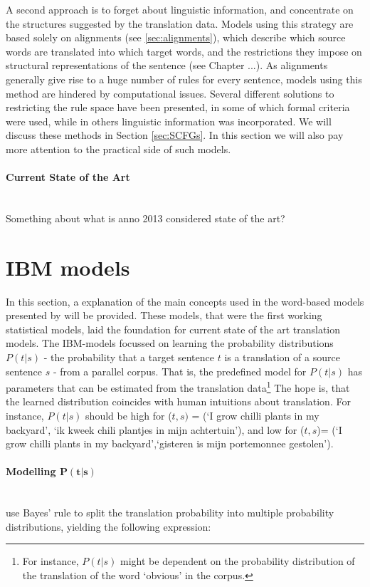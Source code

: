 \documentclass{report}
\newcommand{\myparagraph}[1]{\paragraph{#1}\mbox{}\\}
\theoremstyle{definition}
\theoremstyle{plain}
\begin{document}
A second approach is to forget about linguistic information, and concentrate on the structures suggested by the translation data. Models using this strategy are based solely on alignments (see \ref{sec:alignments}), which describe which source words are translated into which target words, and the restrictions they impose on structural representations of the sentence (see Chapter ...). As alignments generally give rise to a huge number of rules for every sentence, models using this method are hindered by computational issues. Several different solutions to restricting the rule space have been presented, in some of which formal criteria were used, while in others linguistic information was incorporated. We will discuss these methods in Section \ref{sec:SCFGs}. In this section we will also pay more attention to the practical side of such models.

\myparagraph{Current State of the Art}
Something about what is anno 2013 considered state of the art?

\section{IBM models}
\label{sec:IBM}

In this section, a explanation of the main concepts used in the word-based models presented by \cite{brown1993mathematics} will be provided. These models, that were the first working statistical models, laid the foundation for current state of the art translation models. The IBM-models focussed on learning the probability distributions $P(t|s)$ - the probability that a target sentence $t$ is a translation of a source sentence $s$ - from a parallel corpus. That is, the predefined model for $P(t|s)$ has parameters that can be estimated from the translation data\footnote{For instance, $P(t|s)$ might be dependent on the probability distribution of the translation of the word `obvious' in the corpus.} The hope is, that the learned distribution coincides with human intuitions about translation. For instance, $P(t|s)$ should be high for ($t,s)$ = (`I grow chilli plants in my backyard', `ik kweek chili plantjes in mijn achtertuin'), and low for ($t,s$)= (`I grow chilli plants in my backyard',`gisteren is mijn portemonnee gestolen').

\myparagraph{Modelling $\mathbf{P(t|s)}$}
\citeauthor{brown1988statistical} use Bayes' rule to split the translation probability into multiple probability distributions, yielding the following expression:
\end{document}
